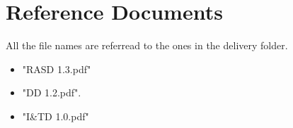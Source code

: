 \section{Reference Documents}
All the file names are referread to the ones in the delivery folder.
\begin{itemize}
	\item "RASD 1.3.pdf"
	\item "DD 1.2.pdf".
	\item "I\&TD 1.0.pdf"
\end{itemize}